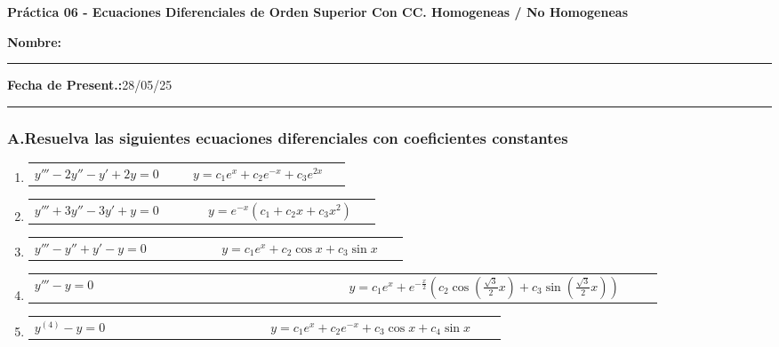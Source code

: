 \documentclass[a4paper,12pt]{article}
\begin{document}
\begin{center}
    \Large\textbf{Práctica 06 - Ecuaciones Diferenciales de Orden Superior Con CC. Homogeneas / No Homogeneas}\\[1cm]  

\end{center}
  \textbf{Nombre:} \rule{7.5cm}{0.4pt}  \textbf{Fecha de Present.:}28/05/25  \rule{0.5cm}{0.4pt} 



\subsubsection*{A.Resuelva las siguientes ecuaciones diferenciales con coeficientes constantes}
\begin{enumerate}
    \item
    \begin{tabularx}{\linewidth}{L{0.45\linewidth} R{0.45\linewidth}}
    \( y''' - 2y'' - y' + 2y = 0 \) & \(\displaystyle y = c_1 e^x + c_2 e^{-x} + c_3 e^{2x} \)
    \end{tabularx}
    
    \item
    \begin{tabularx}{\linewidth}{L{0.45\linewidth} R{0.45\linewidth}}
    \( y''' + 3y'' - 3y' + y = 0 \) & \(\displaystyle y = e^{-x} (c_1 + c_2 x + c_3 x^2) \)
    \end{tabularx}
    
    \item
    \begin{tabularx}{\linewidth}{L{0.45\linewidth} R{0.45\linewidth}}
    \( y''' - y'' + y' - y = 0 \) & \(\displaystyle y = c_1 e^x + c_2 \cos x + c_3 \sin x \)
    \end{tabularx}
    
    \item
    \begin{tabularx}{\linewidth}{L{0.45\linewidth} R{0.45\linewidth}}
    \( y''' - y = 0 \) & \(\displaystyle y = c_1 e^x + e^{-\frac{x}{2}} \left( c_2 \cos\left(\frac{\sqrt{3}}{2} x\right) + c_3 \sin\left(\frac{\sqrt{3}}{2} x\right) \right) \)
    \end{tabularx}
    
    \item
    \begin{tabularx}{\linewidth}{L{0.45\linewidth} R{0.45\linewidth}}
    \( y^{(4)} - y = 0 \) & \(\displaystyle y = c_1 e^x + c_2 e^{-x} + c_3 \cos x + c_4 \sin x \)
    \end{tabularx}
    

\end{enumerate}
\end{document}
